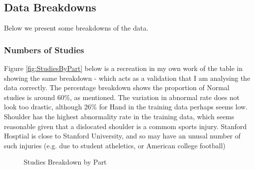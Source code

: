 \documentclass[11pt]{article} %
\theoremstyle{plain}
\theoremstyle{definition}
\begin{document}
\newpage
\subsection{Data Breakdowns}
Below we present some breakdowns of the data.
\subsubsection{Numbers of Studies}
Figure \ref{fig:StudiesByPart} below is a recreation in my own work of the table in \cite{MURA2017} showing the same breakdown - which acts as a validation that I am analysing the data correctly. The percentage breakdown shows the proportion of Normal studies is around 60\%, as mentioned. The variation in abnormal rate does not look too drastic, although 26\% for Hand in the training data perhaps seems low. Shoulder has the highest abnormality rate in the training data, which seems reasonable given that a dislocated shoulder is a commom sports injury. Stanford Hosptial is close to Stanford University, and so may have an unusal number of such injuries (e.g. due to student atheletics, or American college football)
\begin{figure}[!ht]
\centering
{}
\caption{Studies Breakdown by Part}
\label{fig:StudiesByPart_Breakdown}
\end{figure}
\end{document}
